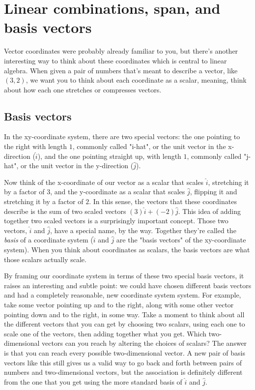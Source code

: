 \section{Linear combinations, span, and basis vectors}

Vector coordinates were probably already familiar to you, but there's another
interesting way to think about these coordinates which is central to linear
algebra. When given a pair of numbers that's meant to describe a vector, like
$(3, 2)$, we want you to think about each coordinate as a scalar, meaning, think
about how each one stretches or compresses vectors.

\subsection{Basis vectors}

In the xy-coordinate system, there are two special vectors: the one pointing to
the right with length $1$, commonly called "i-hat", or the unit vector in the
x-direction ($\hat{i}$), and the one pointing straight up, with length $1$,
commonly called "j-hat", or the unit vector in the y-direction ($\hat{j}$).

Now think of the x-coordinate of our vector as a scalar that scales $\hat{i}$,
stretching it by a factor of $3$, and the y-coordinate as a scalar that scales
$\hat{j}$, flipping it and stretching it by a factor of $2$. In this sense, the
vectors that these coordinates describe is the sum of two scaled vectors
$(3)\hat{i} + (-2)\hat{j}$. This idea of adding together two scaled vectors is a
surprisingly important concept. Those two vectors, $\hat{i}$ and $\hat{j}$, have
a special name, by the way. Together they're called the \textit{basis} of a
coordinate system ($\hat{i}$ and $\hat{j}$ are the "basis vectors" of the
xy-coordinate system). When you think about coordinates as scalars, the basis
vectors are what those scalars actually scale.

By framing our coordinate system in terms of these two special basis vectors, it
raises an interesting and subtle point: we could have chosen different basis
vectors and had a completely reasonable, new coordinate system system. For
example, take some vector pointing up and to the right, along with some other
vector pointing down and to the right, in some way. Take a moment to think about
all the different vectors that you can get by choosing two scalars, using each
one to scale one of the vectors, then adding together what you get. Which
two-dimensional vectors can you reach by altering the choices of scalars? The
answer is that you can reach every possible two-dimensional vector. A new pair
of basis vectors like this still gives us a valid way to go back and forth
between pairs of numbers and two-dimensional vectors, but the association is
definitely different from the one that you get using the more standard basis of
$\hat{i}$ and $\hat{j}$.

